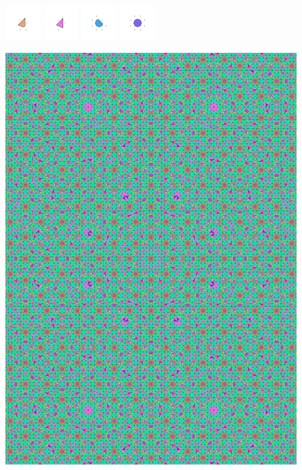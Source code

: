 \documentclass[text.tex]{subfiles}
\begin{document}
\begin{figure}[h!]
\includegraphics[width=0.12\textwidth]{img/results/circle8/circle8_223044_(65_-26alpha_1)_014.pdf}
\includegraphics[width=0.12\textwidth]{img/results/circle8/circle8_223044_(65_-26alpha_1)_015.pdf}
\includegraphics[width=0.12\textwidth]{img/results/circle8/circle8_223044_(65_-26alpha_1)_016.pdf}
\includegraphics[width=0.12\textwidth]{img/results/circle8/circle8_223044_(65_-26alpha_1)_017.pdf}
\end{figure}

\begin{figure}[h!]
\centering
\includegraphics[width=1\textwidth]{img/results/circle8/quasi_circle_223044_(65_-26alpha_1).pdf}
\end{figure}
\end{document}

